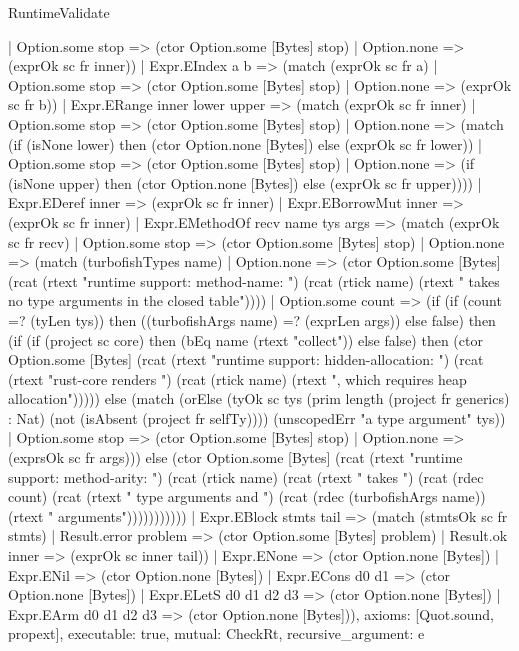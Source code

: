 \begin{lexlean}{RuntimeValidate}
\begin{semanticmodule}
{      | Option.some stop => (ctor Option.some [Bytes] stop)
      | Option.none => (exprOk sc fr inner))
    | Expr.EIndex a b => (match (exprOk sc fr a)
      | Option.some stop => (ctor Option.some [Bytes] stop)
      | Option.none => (exprOk sc fr b))
    | Expr.ERange inner lower upper => (match (exprOk sc fr inner)
      | Option.some stop => (ctor Option.some [Bytes] stop)
      | Option.none => (match (if (isNone lower) then (ctor Option.none [Bytes]) else (exprOk sc fr lower))
        | Option.some stop => (ctor Option.some [Bytes] stop)
        | Option.none => (if (isNone upper) then (ctor Option.none [Bytes]) else (exprOk sc fr upper))))
    | Expr.EDeref inner => (exprOk sc fr inner)
    | Expr.EBorrowMut inner => (exprOk sc fr inner)
    | Expr.EMethodOf recv name tys args => (match (exprOk sc fr recv)
      | Option.some stop => (ctor Option.some [Bytes] stop)
      | Option.none => (match (turbofishTypes name)
        | Option.none => (ctor Option.some [Bytes] (rcat (rtext "runtime support: method-name: ") (rcat (rtick name) (rtext " takes no type arguments in the closed table"))))
        | Option.some count => (if (if (count =? (tyLen tys)) then ((turbofishArgs name) =? (exprLen args)) else false) then (if (if (project sc core) then (bEq name (rtext "collect")) else false) then (ctor Option.some [Bytes] (rcat (rtext "runtime support: hidden-allocation: ") (rcat (rtext "rust-core renders ") (rcat (rtick name) (rtext ", which requires heap allocation"))))) else (match (orElse (tyOk sc tys (prim length (project fr generics) : Nat) (not (isAbsent (project fr selfTy)))) (unscopedErr "a type argument" tys))
          | Option.some stop => (ctor Option.some [Bytes] stop)
          | Option.none => (exprsOk sc fr args))) else (ctor Option.some [Bytes] (rcat (rtext "runtime support: method-arity: ") (rcat (rtick name) (rcat (rtext " takes ") (rcat (rdec count) (rcat (rtext " type arguments and ") (rcat (rdec (turbofishArgs name)) (rtext " arguments")))))))))))
    | Expr.EBlock stmts tail => (match (stmtsOk sc fr stmts)
      | Result.error problem => (ctor Option.some [Bytes] problem)
      | Result.ok inner => (exprOk sc inner tail))
    | Expr.ENone => (ctor Option.none [Bytes])
    | Expr.ENil => (ctor Option.none [Bytes])
    | Expr.ECons d0 d1 => (ctor Option.none [Bytes])
    | Expr.ELetS d0 d1 d2 d3 => (ctor Option.none [Bytes])
    | Expr.EArm d0 d1 d2 d3 => (ctor Option.none [Bytes])),
  axioms: [Quot.sound, propext],
  executable: true,
  mutual: CheckRt,
  recursive_argument: e
}


\end{semanticmodule}
\end{lexlean}
